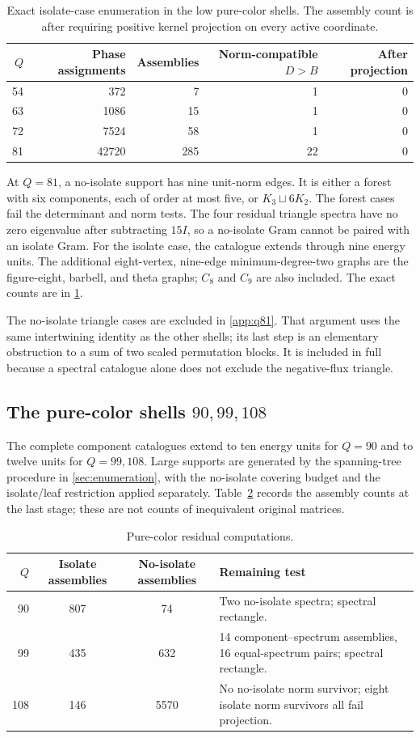 \begin{table}[ht]
\centering\caption{Exact isolate-case enumeration in the low pure-color shells. The assembly count is after requiring positive kernel projection on every active coordinate.}\label{tab:low}
\begin{tabular}{@{}rrrrr@{}}\toprule
$Q$ & Phase assignments & Assemblies & Norm-compatible $D>B$ & After projection\\\midrule
54&372&7&1&0\\
63&1086&15&1&0\\
72&7524&58&1&0\\
81&42720&285&22&0\\\bottomrule
\end{tabular}
\end{table}
At $Q=81$, a no-isolate support has nine unit-norm edges. It is either a forest with six components, each of order at most five, or $K_3\sqcup6K_2$. The forest cases fail the determinant and norm tests. The four residual triangle spectra have no zero eigenvalue after subtracting $15I$, so a no-isolate Gram cannot be paired with an isolate Gram. For the isolate case, the catalogue extends through nine energy units. The additional eight-vertex, nine-edge minimum-degree-two graphs are the figure-eight, barbell, and theta graphs; $C_8$ and $C_9$ are also included. The exact counts are in \cref{tab:low}.

The no-isolate triangle cases are excluded in \cref{app:q81}. That argument uses the same intertwining identity as the other shells; its last step is an elementary obstruction to a sum of two scaled permutation blocks. It is included in full because a spectral catalogue alone does not exclude the negative-flux triangle.

\subsection{The pure-color shells \texorpdfstring{$90,99,108$}{90,99,108}}
The complete component catalogues extend to ten energy units for $Q=90$ and to twelve units for $Q=99,108$. Large supports are generated by the spanning-tree procedure in \cref{sec:enumeration}, with the no-isolate covering budget and the isolate/leaf restriction applied separately. Table~\ref{tab:pure} records the assembly counts at the last stage; these are not counts of inequivalent original matrices.
\begin{table}[ht]
\centering\caption{Pure-color residual computations.}\label{tab:pure}
\begin{tabular}{@{}rccp{66mm}@{}}\toprule
$Q$ & Isolate assemblies & No-isolate assemblies & Remaining test\\\midrule
90 &807&74&Two no-isolate spectra; spectral rectangle.\\
99 &435&632&14 component--spectrum assemblies, 16 equal-spectrum pairs; spectral rectangle.\\
108&146&5570&No no-isolate norm survivor; eight isolate norm survivors all fail projection.\\\bottomrule
\end{tabular}
\end{table}

